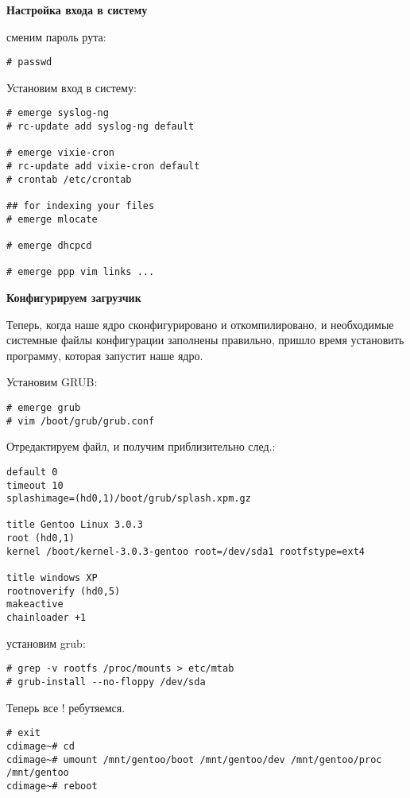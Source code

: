 \documentclass[12pt, a4paper]{article}
\begin{document}
{\bf Настройка входа в систему}

сменим пароль рута:

\begin{verbatim}
# passwd
\end{verbatim}

Установим вход в систему:

\begin{verbatim}
# emerge syslog-ng
# rc-update add syslog-ng default

# emerge vixie-cron
# rc-update add vixie-cron default
# crontab /etc/crontab

## for indexing your files
# emerge mlocate

# emerge dhcpcd

# emerge ppp vim links ...
\end{verbatim}


{\bf Конфигурируем загрузчик}

Теперь, когда наше ядро сконфигурировано и откомпилировано, и необходимые системные файлы конфигурации заполнены правильно, пришло время установить программу, которая запустит наше ядро.

Установим GRUB:

\begin{verbatim}
# emerge grub
# vim /boot/grub/grub.conf
\end{verbatim}

Отредактируем файл, и получим приблизительно след.:

\begin{verbatim}
default 0
timeout 10
splashimage=(hd0,1)/boot/grub/splash.xpm.gz

title Gentoo Linux 3.0.3
root (hd0,1)
kernel /boot/kernel-3.0.3-gentoo root=/dev/sda1 rootfstype=ext4

title windows XP
rootnoverify (hd0,5)
makeactive
chainloader +1
\end{verbatim}

установим grub:

\begin{verbatim}
# grep -v rootfs /proc/mounts > etc/mtab
# grub-install --no-floppy /dev/sda
\end{verbatim}

Теперь все ! ребутяемся.

\begin{verbatim}
# exit 
cdimage~# cd 
cdimage~# umount /mnt/gentoo/boot /mnt/gentoo/dev /mnt/gentoo/proc /mnt/gentoo
cdimage~# reboot

\end{verbatim}
\end{document}
